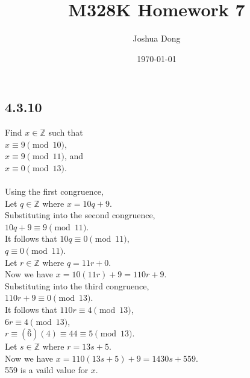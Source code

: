 \documentclass{article}
\begin{document}
\title{M328K\: Homework 7}
\author{Joshua Dong}
\date{\today}
\maketitle



\subsection{4.3.10}
Find $x\in\mathbb{Z}$ such that\
\\$x\equiv9\pmod{10}$,
\\$x\equiv9\pmod{11}$, and
\\$x\equiv0\pmod{13}$.
\\
\\Using the first congruence,
\\Let $q \in \mathbb{Z}$ where $x=10q+9$.
\\Substituting into the second congruence,
\\$10q + 9 \equiv 9 \pmod{11}$.
\\It follows that $10q \equiv 0 \pmod{11}$,
\\$q \equiv 0 \pmod{11}$.
\\Let $r \in \mathbb{Z}$ where $q=11r+0$.
\\Now we have $x=10(11r)+9=110r+9$.
\\Substituting into the third congruence,
\\$110r + 9 \equiv 0 \pmod{13}$.
\\It follows that $110r \equiv 4 \pmod{13}$,
\\$6r \equiv 4 \pmod{13}$,
\\$r \equiv (\bar{6})(4) \equiv 44 \equiv 5 \pmod{13}$.
\\Let $s \in \mathbb{Z}$ where $r=13s+5$.
\\Now we have $x=110(13s+5)+9=1430s+559$.
\\559 is a vaild value for $x$.

\newpage
\end{document}
